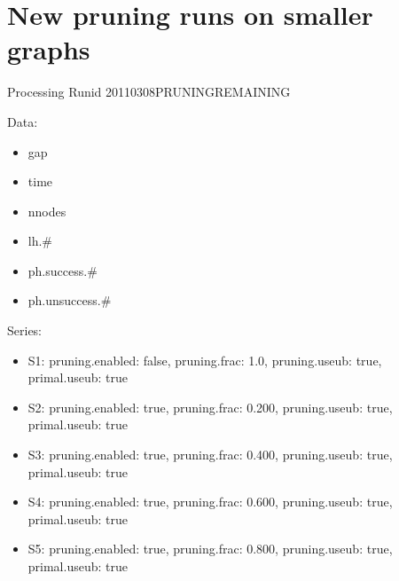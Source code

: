 \documentclass[landscape, 12pt]{report}
\begin{document}
\section{New pruning runs on smaller graphs}

Processing Runid 20110308PRUNINGREMAINING

Data:
\begin{itemize}
\item gap
\item time
\item nnodes
\item lh.\#
\item ph.success.\#
\item ph.unsuccess.\#
\end{itemize}
Series:
\begin{itemize}
\item S1: pruning.enabled: false, pruning.frac: 1.0, pruning.useub: true, primal.useub: true
\item S2: pruning.enabled: true, pruning.frac: 0.200, pruning.useub: true, primal.useub: true
\item S3: pruning.enabled: true, pruning.frac: 0.400, pruning.useub: true, primal.useub: true
\item S4: pruning.enabled: true, pruning.frac: 0.600, pruning.useub: true, primal.useub: true
\item S5: pruning.enabled: true, pruning.frac: 0.800, pruning.useub: true, primal.useub: true
\end{itemize}
\end{document}
